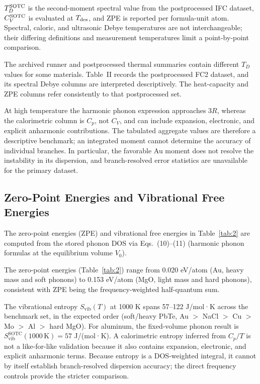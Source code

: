 \documentclass[aps,prb,reprint,amsmath,amssymb,floatfix]{revtex4-2}
\begin{document}
\color{revisionblue}
\(T_D^{\rm SOTC}\) is the second-moment spectral value from the
postprocessed IFC dataset, \(C_V^{\rm SOTC}\) is evaluated at
\(T_{\rm des}\), and ZPE is reported per formula-unit atom. Spectral, caloric,
and ultrasonic Debye temperatures are not interchangeable; their differing
definitions and measurement temperatures limit a point-by-point comparison.
\color{black}

\color{revisionblue}
The archived runner and postprocessed thermal summaries contain different
\(T_D\) values for some materials. Table~II records the postprocessed FC2
dataset, and its spectral Debye columns are interpreted descriptively. The
heat-capacity and ZPE columns refer consistently to that postprocessed set.
\color{black}

\color{revisionblue}
At high temperature the harmonic phonon expression approaches \(3R\), whereas
the calorimetric column is \(C_p\), not \(C_V\), and can include expansion,
electronic, and explicit anharmonic contributions. The tabulated aggregate values are therefore a descriptive benchmark;
an integrated moment cannot determine the accuracy of individual branches. In
particular, the favorable Au moment does not resolve the instability in its
dispersion, and branch-resolved error statistics are unavailable for the
primary dataset.
\color{black}

\subsection{Zero-Point Energies and Vibrational Free
Energies}\label{zero-point-energies-and-vibrational-free-energies}

\color{revisionblue}
The zero-point energies (ZPE) and vibrational free energies
in Table~\ref{tab:2} are computed from the stored phonon DOS via
Eqs.~(10)--(11) (harmonic phonon formulas at the equilibrium volume
\(V_0\)).
\color{black}

\color{revisionblue}
The zero-point energies (Table~\ref{tab:2}) range from 0.020 eV/atom (Au, heavy
mass and soft phonons) to 0.153 eV/atom (MgO, light mass and hard phonons),
consistent with ZPE being the frequency-weighted half-quantum sum.
\color{black}

\color{revisionblue}
The vibrational entropy \(S_\text{vib}(T)\) at 1000 K spans 57--122
J/mol·K across the benchmark set, in the expected order (soft/heavy
PbTe, Au \(>\) NaCl \(>\) Cu \(>\) Mo \(>\) Al \(>\) hard MgO). For aluminum,
the fixed-volume phonon result is
\(S_\text{vib}^\text{SOTC}(1000\,\text{K}) = 57\) J/(mol·K). A calorimetric
entropy inferred from \(C_p/T\) is not a like-for-like validation because it
also contains expansion, electronic, and explicit anharmonic terms. Because
entropy is a DOS-weighted integral, it cannot by itself establish
branch-resolved dispersion accuracy; the direct frequency controls provide the
stricter comparison.
\color{black}
\end{document}
